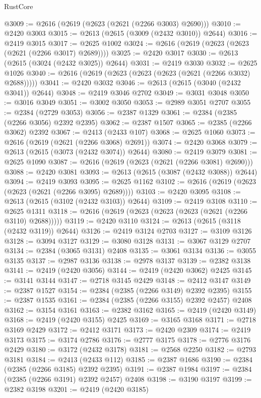 \begin{lexlean}{RustCore}
\begin{coremodule}
@3009 := @2616 (@2619 (@2623 (@2621 (@2266 @3003) @2690)))
@3010 := @2420 @3003
@3015 := @2613 (@2615 (@3009 (@2432 @3010)) @2644)
@3016 := @2419 @3015
@3017 := @2625 @1002
@3024 := @2616 (@2619 (@2623 (@2623 (@2621 (@2266 @3017) @2689))))
@3025 := @2420 @3017
@3030 := @2613 (@2615 (@3024 (@2432 @3025)) @2644)
@3031 := @2419 @3030
@3032 := @2625 @1026
@3040 := @2616 (@2619 (@2623 (@2623 (@2623 (@2621 (@2266 @3032) @2688)))))
@3041 := @2420 @3032
@3046 := @2613 (@2615 (@3040 (@2432 @3041)) @2644)
@3048 := @2419 @3046 @2702
@3049 := @3031 @3048
@3050 := @3016 @3049
@3051 := @3002 @3050
@3053 := @2989 @3051 @2707
@3055 := @2384 (@2729 @3053)
@3056 := @2387 @1329
@3061 := @2384 (@2385 (@2266 @3056) @2392 @2395)
@3062 := @2387 @1507
@3065 := @2385 (@2266 @3062) @2392
@3067 := @2413 (@2433 @107)
@3068 := @2625 @1060
@3073 := @2616 (@2619 (@2621 (@2266 @3068) @2691))
@3074 := @2420 @3068
@3079 := @2613 (@2615 (@3073 (@2432 @3074)) @2644)
@3080 := @2419 @3079
@3081 := @2625 @1090
@3087 := @2616 (@2619 (@2623 (@2621 (@2266 @3081) @2690)))
@3088 := @2420 @3081
@3093 := @2613 (@2615 (@3087 (@2432 @3088)) @2644)
@3094 := @2419 @3093
@3095 := @2625 @1162
@3102 := @2616 (@2619 (@2623 (@2623 (@2621 (@2266 @3095) @2689))))
@3103 := @2420 @3095
@3108 := @2613 (@2615 (@3102 (@2432 @3103)) @2644)
@3109 := @2419 @3108
@3110 := @2625 @1311
@3118 := @2616 (@2619 (@2623 (@2623 (@2623 (@2621 (@2266 @3110) @2688)))))
@3119 := @2420 @3110
@3124 := @2613 (@2615 (@3118 (@2432 @3119)) @2644)
@3126 := @2419 @3124 @2703
@3127 := @3109 @3126
@3128 := @3094 @3127
@3129 := @3080 @3128
@3131 := @3067 @3129 @2707
@3134 := @2384 (@3065 @3131) @2408
@3135 := @3061 @3134
@3136 := @3055 @3135
@3137 := @2987 @3136
@3138 := @2978 @3137
@3139 := @2382 @3138
@3141 := @2419 (@2420 @3056)
@3144 := @2419 (@2420 @3062) @2425
@3145 := @3141 @3144
@3147 := @2718 @3145 @2429
@3148 := @2412 @3147
@3149 := @2387 @1527
@3154 := @2384 (@2385 (@2266 @3149) @2392 @2395)
@3155 := @2387 @1535
@3161 := @2384 (@2385 (@2266 @3155) @2392 @2457) @2408
@3162 := @3154 @3161
@3163 := @2382 @3162
@3165 := @2419 (@2420 @3149)
@3168 := @2419 (@2420 @3155) @2425
@3169 := @3165 @3168
@3171 := @2718 @3169 @2429
@3172 := @2412 @3171
@3173 := @2420 @2309
@3174 := @2419 @3173
@3175 := @3174 @2786
@3176 := @2777 @3175
@3178 := @2776 @3176 @2429
@3180 := @3172 (@2432 @3178)
@3181 := @2568 @2250
@3182 := @2793 @3181
@3184 := @2413 (@2433 @112)
@3185 := @2387 @1686
@3190 := @2384 (@2385 (@2266 @3185) @2392 @2395)
@3191 := @2387 @1984
@3197 := @2384 (@2385 (@2266 @3191) @2392 @2457) @2408
@3198 := @3190 @3197
@3199 := @2382 @3198
@3201 := @2419 (@2420 @3185)

\end{coremodule}
\end{lexlean}
